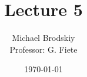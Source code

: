 


\title{Lecture 5}
\date{\today}
\author{Michael Brodskiy\\ \small Professor: G. Fiete}



\maketitle

